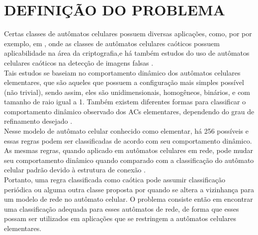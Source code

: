 % 
%


\chapter{DEFINIÇÃO DO PROBLEMA}
\label{chap:definicaoproblema}
Certas classes de autômatos celulares possuem diversas aplicações, como, por por exemplo, em , onde as classes de autômatos celulares caóticos possuem aplicabilidade na área da criptografia,e há também estudos do uso de autômatos celulares caóticos na detecção de imagens falsas \cite{imageforgery}. \\

Tais estudos se baseiam no comportamento dinâmico dos autômatos celulares elementares, que são aqueles que possuem a configuração mais simples possível (não trivial), sendo assim, eles são unidimensionais, homogêneos, binários, e com tamanho de raio
igual a 1. Também existem diferentes formas para classificar o comportamento dinâmico observado dos
ACs elementares, dependendo do grau de refinamento desejado \cite{acsaspectosdimanicosecomputacionais}.\\

Nesse modelo de autômato celular conhecido como elementar, há 256 possíveis e essas regras podem ser classificadas de acordo com seu comportamento dinâmico. As mesmas regras,
quando aplicado em autômatos celulares em rede, pode mudar seu comportamento dinâmico quando comparado com a classificação do autômato celular padrão devido à estrutura de conexão \cite{hevertonAutomatoRede}.\\

Portanto, uma regra classificada como caótica pode assumir classificação periódica ou alguma outra classe proposta por  quando se altera a vizinhança para um modelo de rede no autômato celular. O problema consiste então em encontrar uma classificação adequada para esses autômatos de rede, de forma que esses possam ser utilizados em aplicações que se restringem a autômatos celulares elementares.  